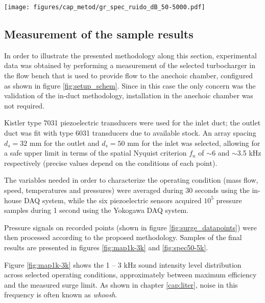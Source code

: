\begin{figure*}[t!]
\centering
\texttt{[image: figures/cap\_metod/gr\_spec\_ruido\_dB\_50-5000.pdf]}
\caption[Sample of spectrograms following the 160 krpm line]{Sample of spectrograms calculated using the procedure outlined in subsection \ref{sub:noise_maps_and_spectrograms}, following the 160 krpm paths marked in figure \ref{fig:map1k-3k}. The 1 -- 3 kHz band selected for the maps in figure \ref{fig:map1k-3k} is highlighted, along with some particular flow phenomena discussed in section \ref{sec:sample_meas}.}
\label{fig:spec50-5k}
\end{figure*}

\subsection{Measurement of the sample results}
\label{sec:sample_meas}

In order to illustrate the presented methodology along this section, experimental data was obtained by performing a measurement of the selected turbocharger in the flow bench that is used to provide flow to the anechoic chamber, configured as shown in figure \ref{fig:setup_schem}. Since in this case the only concern was the validation of the in-duct methodology, installation in the anechoic chamber was not required. 

Kistler type 7031 piezoelectric transducers were used for the inlet duct; the outlet duct was fit with type 6031 transducers due to available stock. An array spacing $d_s=32$ mm for the outlet and $d_s=50$ mm for the inlet was selected, allowing for a safe upper limit in terms of the spatial Nyquist criterion $f_n$ of $\sim$6 and $\sim$3.5 kHz respectively (precise values depend on the conditions of each point).

The variables needed in order to characterize the operating condition (mass flow, speed, temperatures and pressures) were averaged during 30 seconds using the in-house DAQ system, while the six piezoelectric sensors acquired $10^5$ pressure samples during 1 second using the Yokogawa DAQ system.

Pressure signals on recorded points (shown in figure \ref{fig:surge_datapoints}) were then processed according to the proposed methodology. Samples of the final results are presented in figures \ref{fig:map1k-3k} and \ref{fig:spec50-5k}.

Figure \ref{fig:map1k-3k} shows the 1 -- 3 kHz sound intensity level distribution across selected operating conditions, approximately between maximum efficiency and the measured surge limit. As shown in chapter \ref{cap:liter}, noise in this frequency is often known as \emph{whoosh}.


